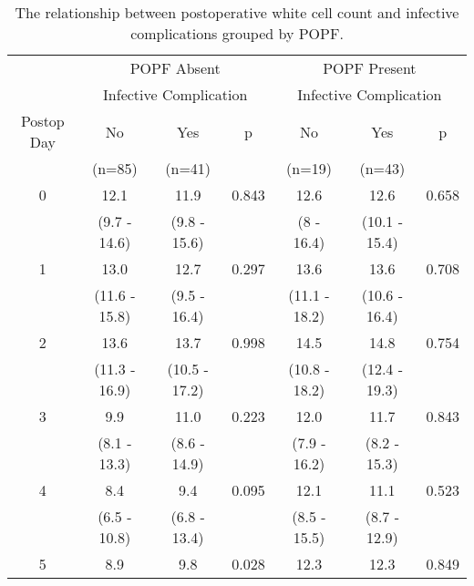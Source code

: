 \begin{table}[h]
	\centering
	\caption{The relationship between postoperative white cell count and infective complications grouped by POPF.}
	\label{table:crp_comp_WCC_vs_infections_popf_y1n0}
	\begin{tabular}{| c | c c c | c c c |}
		\hline
		           &       \multicolumn{3}{c|}{POPF Absent}       &      \multicolumn{3}{c|}{POPF Present}       \\
		           & \multicolumn{3}{c|}{Infective Complication} & \multicolumn{3}{c|}{Infective Complication} \\
		Postop Day & No            & Yes           & p            & No            & Yes           & p            \\
		           & (n=85)        & (n=41)        &              & (n=19)        & (n=43)        &  \\ \hline
		0          & 12.1          & 11.9          & 0.843        & 12.6          & 12.6          & 0.658        \\
		           & (9.7 - 14.6)  & (9.8 - 15.6)  &              & (8 - 16.4)    & (10.1 - 15.4) &  \\
		1          & 13.0          & 12.7          & 0.297        & 13.6          & 13.6          & 0.708        \\
		           & (11.6 - 15.8) & (9.5 - 16.4)  &              & (11.1 - 18.2) & (10.6 - 16.4) &  \\
		2          & 13.6          & 13.7          & 0.998        & 14.5          & 14.8          & 0.754        \\
		           & (11.3 - 16.9) & (10.5 - 17.2) &              & (10.8 - 18.2) & (12.4 - 19.3) &  \\
		3          & 9.9           & 11.0          & 0.223        & 12.0          & 11.7          & 0.843        \\
		           & (8.1 - 13.3)  & (8.6 - 14.9)  &              & (7.9 - 16.2)  & (8.2 - 15.3)  &  \\
		4          & 8.4           & 9.4           & 0.095        & 12.1          & 11.1          & 0.523        \\
		           & (6.5 - 10.8)  & (6.8 - 13.4)  &              & (8.5 - 15.5)  & (8.7 - 12.9)  &  \\
		5          & 8.9           & 9.8           & 0.028        & 12.3          & 12.3          & 0.849        \\

\end{tabular}
\end{table}

